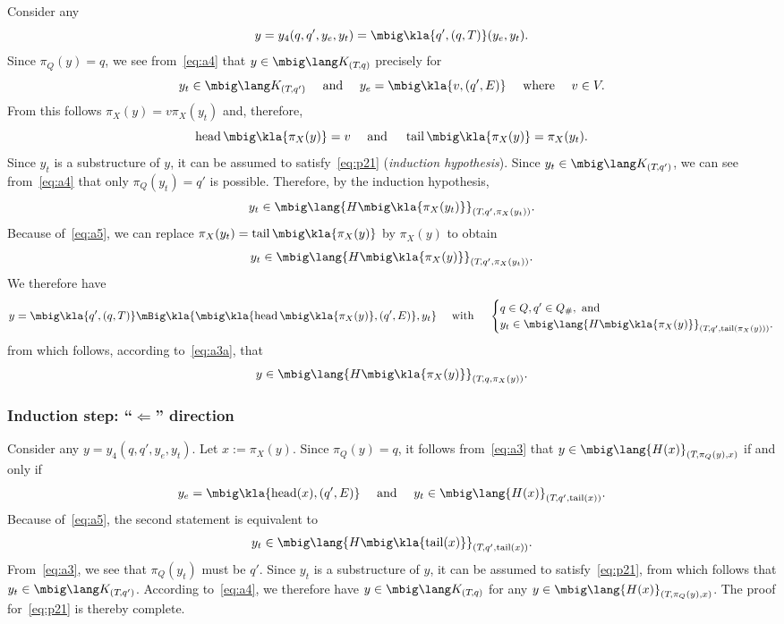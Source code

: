 Consider any
\[
 y = y_4(q,q',y_e,y_t) = \mbig\kla{q',(q,T)}(y_e,y_t).
\]
Since $\pi_Q(y) = q$, we see from~\eqref{eq:a4} that $y\in\mbig\lang K_{(T\!,q)}$ precisely for
\[
 y_t \in \mbig\lang K_{(T\!,q')}
 \quad\text{ and }\quad
 y_e = \mbig\kla{v,(q',E)}
 \quad\text{ where }\quad
 v\in V.
\]
From this follows $\pi_X(y) = v\pi_X(y_t)$ and, therefore,
\[
 \car\mbig\kla{\pi_X(y)} = v
 \quad\text{ and }\quad
 \cdr\mbig\kla{\pi_X(y)} = \pi_X(y_t).
\]
Since $y_t$ is a substructure of $y$, it can be assumed to
satisfy~\eqref{eq:p21} (\emph{induction hypothesis}). Since $y_t\in\mbig\lang
K_{(T\!,q')}$, we can see from~\eqref{eq:a4} that only $\pi_Q(y_t) = q'$ is
possible. Therefore, by the induction hypothesis,
\[
 y_t \in \mbig\lang{H\mbig\kla{\pi_X(y_t)}}_{(T\!,q',\pi_X(y_t))}.
\]
Because of~\eqref{eq:a5}, we can replace $\pi_X(y_t) = \cdr\mbig\kla{\pi_X(y)}$ by $\pi_X(y)$ to obtain
\[
 y_t \in \mbig\lang{H\mbig\kla{\pi_X(y)}}_{(T\!,q',\pi_X(y_t))}.
\]
We therefore have
\[
 y = \mbig\kla{q',(q,T)}\mBig\kla{\mbig\kla{\car\mbig\kla{\pi_X(y)},(q',E)},y_t}
 \quad\text{ with }\quad
 \begin{cases}
  &\hspace*{-1em} q \in Q, q' \in Q_\#, \text{ and}\\
  &\hspace*{-1em} y_t \in \mbig\lang{H\mbig\kla{\pi_X(y)}}_{(T\!,q',\cdr(\pi_X(y)))}.
 \end{cases}
\]
from which follows, according to~\eqref{eq:a3a}, that
\[
 y \in \mbig\lang{H\mbig\kla{\pi_X(y)}}_{(T\!,q,\pi_X(y))}.
\]

\subsubsection*{Induction step: ``$\Leftarrow$'' direction}

Consider any $y = y_4(q,q',y_e,y_t)$. Let $x := \pi_X(y)$. Since $\pi_Q(y) = q$,
it follows from~\eqref{eq:a3} that
$y\in\mbig\lang{H(x)}_{(T\!,\pi_Q(y),x)}$ if and only if
\[
 y_e = \mbig\kla{\car(x),(q',E)}
 \quad\text{ and }\quad
 y_t \in \mbig\lang{H(x)}_{(T\!,q',\cdr(x))}.
\]
Because of~\eqref{eq:a5}, the second statement is equivalent to
\[
 y_t \in \mbig\lang{H\mbig\kla{\cdr(x)}}_{(T\!,q',\cdr(x))}.
\]
From~\eqref{eq:a3}, we see that $\pi_Q(y_t)$ must be $q'$. Since $y_t$ is a
substructure of $y$, it can be assumed to satisfy~\eqref{eq:p21}, from which
follows that $y_t \in \mbig\lang K_{(T\!,q')}$. According to~\eqref{eq:a4}, we
therefore have $y\in\mbig\lang K_{(T\!,q)}$ for any
$y\in\mbig\lang{H(x)}_{(T\!,\pi_Q(y),x)}$. The proof for~\eqref{eq:p21} is
thereby complete.


